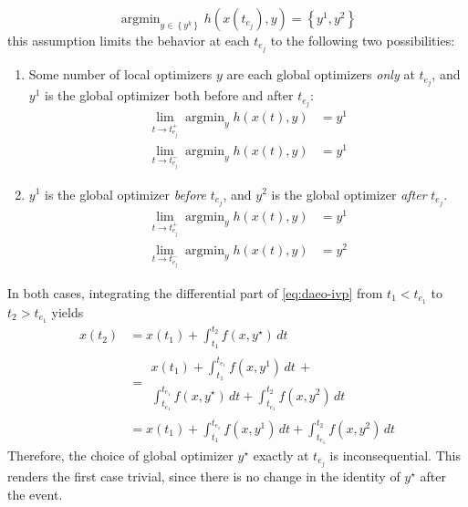 \documentclass[twoside,leqno, twocolumn]{article}
\DeclareMathOperator*{\argmin}{\arg\min}
\begin{document}
\begin{equation*}
	\argmin_{y\in\left\{y^k\right\}} h(x(t_{e_j}), y) = \left\{y^1, y^2\right\}
\end{equation*}
this assumption limits the behavior at each $t_{e_j}$ to the following two possibilities:
\begin{enumerate}
	\item Some number of local optimizers $y$ are each global optimizers \textit{only} at $t_{e_j}$, and $y^1$ is the global optimizer both before and after $t_{e_j}$:
	\begin{equation*}
		\begin{aligned}
			\lim_{t\to t_{e_j}^+} \argmin_{y} h(x(t), y) &= y^1\\
			\lim_{t\to t_{e_j}^-} \argmin_{y} h(x(t), y) &= y^1
		\end{aligned}
	\end{equation*}
	\item $y^1$ is the global optimizer \textit{before} $t_{e_j}$, and $y^2$ is the global optimizer \textit{after} $t_{e_j}$.
	\begin{equation*}
		\begin{aligned}
			\lim_{t\to t_{e_j}^+} \argmin_{y} h(x(t), y) &= y^1\\
			\lim_{t\to t_{e_j}^-} \argmin_{y} h(x(t), y) &= y^2
		\end{aligned}
	\end{equation*}
\end{enumerate}
In both cases, integrating the differential part of \eqref{eq:daeo-ivp} from $t_1 < t_{e_1}$ to $t_2 > t_{e_1}$ yields
\begin{equation}
	\begin{aligned}
		x(t_2) &= x(t_1) + \int_{t_1}^{t_2}f(x, y^\star)\,dt\\
		&=\begin{split}
			x(t_1) + \int_{t_1}^{t_{e_1}}f(x, y^1)\,dt\,+\\
			\int_{t_{e_1}}^{t_{e_1}}f(x, y^\star)\,dt +\int_{t_{e_1}}^{t_2}f(x, y^2)\,dt
		\end{split}\\
		&=x(t_1) + \int_{t_1}^{t_{e_1}}f(x, y^1)\,dt + \int_{t_{e_1}}^{t_2}f(x, y^2)\,dt
	\end{aligned}
\end{equation}
Therefore, the choice of global optimizer $y^\star$ exactly at $t_{e_j}$ is inconsequential. This renders the first case trivial, since there is no change in the identity of $y^\star$ after the event.
\end{document}
